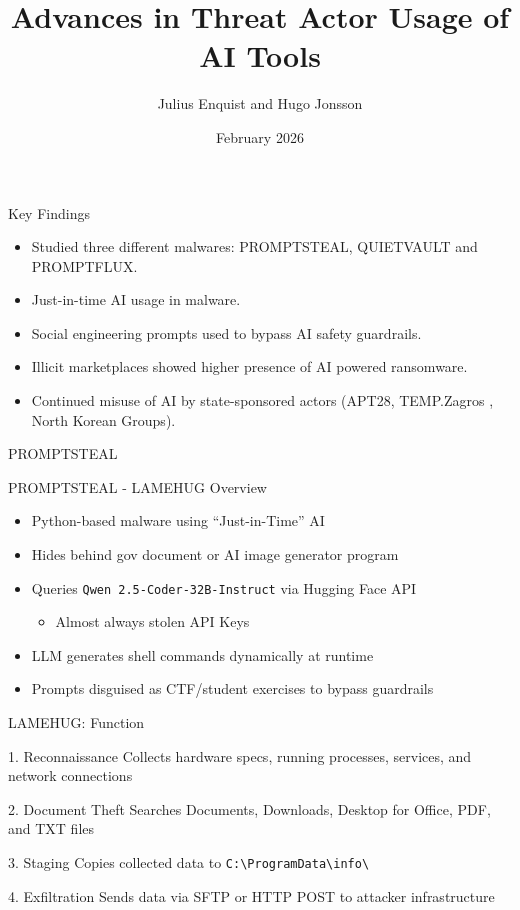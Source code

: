 \documentclass{beamer}
\title{Advances in Threat Actor Usage of AI Tools}
\author{Julius Enquist and Hugo Jonsson}
\date{February 2026}
\begin{document}
\begin{frame}
\titlepage
\end{frame}

\begin{frame}{Key Findings}
\begin{itemize}
    \item Studied three different malwares: PROMPTSTEAL, QUIETVAULT and PROMPTFLUX.
    \item Just-in-time AI usage in malware.
    \item Social engineering prompts used to bypass AI safety guardrails.
    \item Illicit marketplaces showed higher presence of AI powered ransomware.
    \item Continued misuse of AI by state-sponsored actors (APT28, TEMP.Zagros , North Korean Groups).
\end{itemize}
\end{frame}

\begin{frame}{PROMPTSTEAL}
\Large{}
\end{frame}

\begin{frame}{PROMPTSTEAL - LAMEHUG Overview}
\begin{itemize}
    \item Python-based malware using ``Just-in-Time'' AI
    \item Hides behind gov document or AI image generator program
    \item Queries \texttt{Qwen 2.5-Coder-32B-Instruct} via Hugging Face API
        \begin{itemize}
            \item Almost always stolen API Keys
        \end{itemize}
    \item LLM generates shell commands dynamically at runtime
    \item Prompts disguised as CTF/student exercises to bypass guardrails
\end{itemize}
\end{frame}

\begin{frame}{LAMEHUG: Function}
\begin{block}{1. Reconnaissance}
Collects hardware specs, running processes, services, and network connections
\end{block}

\begin{block}{2. Document Theft}
Searches Documents, Downloads, Desktop for Office, PDF, and TXT files
\end{block}

\begin{block}{3. Staging}
Copies collected data to \texttt{C:\textbackslash ProgramData\textbackslash info\textbackslash}
\end{block}

\begin{block}{4. Exfiltration}
Sends data via SFTP or HTTP POST to attacker infrastructure
\end{block}
\end{frame}
\end{document}
